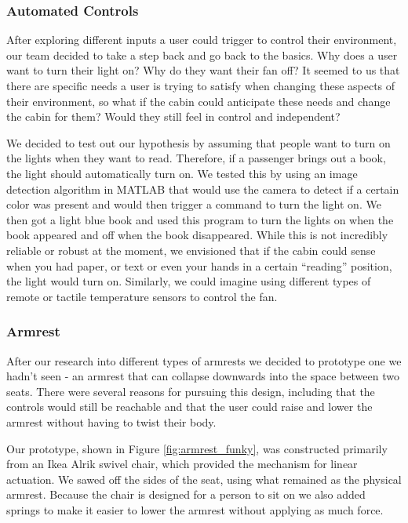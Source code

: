\subsubsection{Automated Controls}

After exploring different inputs a user could trigger to control their environment, our team decided to take a step back and go back to the basics. Why does a user want to turn their light on? Why do they want their fan off? It seemed to us that there are specific needs a user is trying to satisfy when changing these aspects of their environment, so what if the cabin could anticipate these needs and change the cabin for them? Would they still feel in control and independent? 

We decided to test out our hypothesis by assuming that people want to turn on the lights when they want to read. Therefore, if a passenger brings out a book, the light should automatically turn on. We tested this by using an image detection algorithm in MATLAB that would use the camera to detect if a certain color was present and would then trigger a command to turn the light on. We then got a light blue book and used this program to turn the lights on when the book appeared and off when the book disappeared. While this is not incredibly reliable or robust at the moment, we envisioned that if the cabin could sense when you had paper, or text or even your hands in a certain “reading” position, the light would turn on. Similarly, we could imagine using different types of remote or tactile temperature sensors to control the fan.

\subsubsection{Armrest}
After our research into different types of armrests we decided to prototype one we hadn't seen - an armrest that can collapse downwards into the space between two seats. There were several reasons for pursuing this design, including that the controls would still be reachable and that the user could raise and lower the armrest without having to twist their body.

Our prototype, shown in Figure \ref{fig:armrest_funky}, was constructed primarily from an Ikea Alrik swivel chair, which provided the mechanism for linear actuation. We sawed off the sides of the seat, using what remained as the physical armrest. Because the chair is designed for a person to sit on we also added springs to make it easier to lower the armrest without applying as much force.


